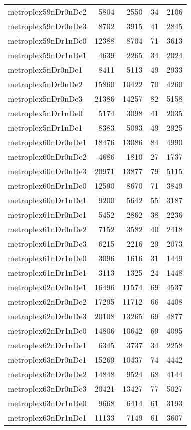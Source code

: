 \begin{longtable}{lrrrr}
metroplex59nDr0nDe2 & 5804 & 2550 & 34 & 2106 \\
metroplex59nDr0nDe3 & 8702 & 3915 & 41 & 2845 \\
metroplex59nDr1nDe0 & 12388 & 8704 & 71 & 3613 \\
metroplex59nDr1nDe1 & 4639 & 2265 & 34 & 2024 \\
metroplex5nDr0nDe1 & 8411 & 5113 & 49 & 2933 \\
metroplex5nDr0nDe2 & 15860 & 10422 & 70 & 4260 \\
metroplex5nDr0nDe3 & 21386 & 14257 & 82 & 5158 \\
metroplex5nDr1nDe0 & 5174 & 3098 & 41 & 2035 \\
metroplex5nDr1nDe1 & 8383 & 5093 & 49 & 2925 \\
metroplex60nDr0nDe1 & 18476 & 13086 & 84 & 4990 \\
metroplex60nDr0nDe2 & 4686 & 1810 & 27 & 1737 \\
metroplex60nDr0nDe3 & 20971 & 13877 & 79 & 5115 \\
metroplex60nDr1nDe0 & 12590 & 8670 & 71 & 3849 \\
metroplex60nDr1nDe1 & 9200 & 5642 & 55 & 3187 \\
metroplex61nDr0nDe1 & 5452 & 2862 & 38 & 2236 \\
metroplex61nDr0nDe2 & 7152 & 3582 & 40 & 2418 \\
metroplex61nDr0nDe3 & 6215 & 2216 & 29 & 2073 \\
metroplex61nDr1nDe0 & 3096 & 1616 & 31 & 1449 \\
metroplex61nDr1nDe1 & 3113 & 1325 & 24 & 1448 \\
metroplex62nDr0nDe1 & 16496 & 11574 & 69 & 4537 \\
metroplex62nDr0nDe2 & 17295 & 11712 & 66 & 4408 \\
metroplex62nDr0nDe3 & 20108 & 13265 & 69 & 4877 \\
metroplex62nDr1nDe0 & 14806 & 10642 & 69 & 4095 \\
metroplex62nDr1nDe1 & 6345 & 3737 & 34 & 2258 \\
metroplex63nDr0nDe1 & 15269 & 10437 & 74 & 4442 \\
metroplex63nDr0nDe2 & 14848 & 9524 & 68 & 4144 \\
metroplex63nDr0nDe3 & 20421 & 13427 & 77 & 5027 \\
metroplex63nDr1nDe0 & 9668 & 6414 & 61 & 3193 \\
metroplex63nDr1nDe1 & 11133 & 7149 & 61 & 3607 \\

\end{longtable}
